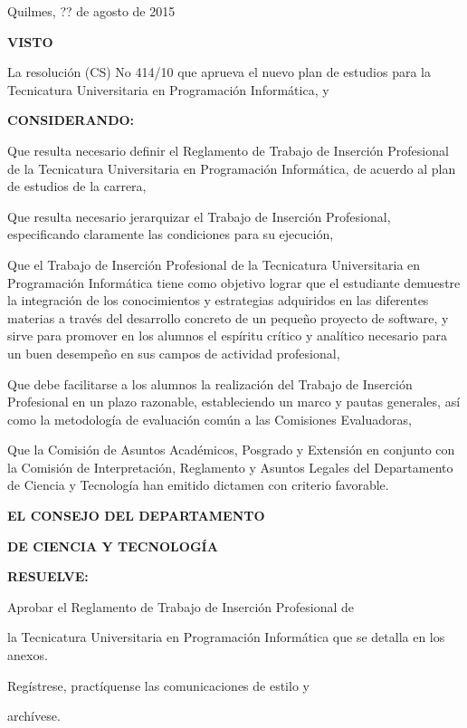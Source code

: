 Quilmes, ?? de agosto de 2015

\textbf{VISTO}

La resolución (CS) No 414/10 que aprueva el nuevo plan de estudios para la Tecnicatura Universitaria 
en Programación Informática, y
\newline

\textbf{CONSIDERANDO:}

Que resulta necesario definir el Reglamento de Trabajo de Inserción
Profesional de la Tecnicatura Universitaria en Programación Informática, de acuerdo al
plan de estudios de la carrera,

Que resulta necesario jerarquizar el Trabajo de Inserción Profesional,
especificando claramente las condiciones para su ejecución,

Que el Trabajo de Inserción Profesional de la Tecnicatura Universitaria en
Programación Informática tiene como objetivo lograr que el estudiante demuestre la
integración de los conocimientos y estrategias adquiridos en las diferentes materias a
través del desarrollo concreto de un pequeño proyecto de software, y sirve para
promover en los alumnos el espíritu crítico y analítico necesario para un buen
desempeño en sus campos de actividad profesional,

Que debe facilitarse a los alumnos la realización del Trabajo de Inserción
Profesional en un plazo razonable, estableciendo un marco y pautas generales, así
como la metodología de evaluación común a las Comisiones Evaluadoras,

Que la Comisión de Asuntos Académicos, Posgrado y Extensión en conjunto
con la Comisión de Interpretación, Reglamento y Asuntos Legales del Departamento
de Ciencia y Tecnología han emitido dictamen con criterio favorable.\newline

\centerline{\textbf{EL CONSEJO DEL DEPARTAMENTO}}
\centerline{\textbf{DE CIENCIA Y TECNOLOGÍA}}
\centerline{\textbf{RESUELVE:}}


\articulo Aprobar el Reglamento de Trabajo de Inserción Profesional de

la Tecnicatura Universitaria en Programación Informática que se detalla en los anexos.

\articulo Regístrese, practíquense las comunicaciones de estilo y

archívese.
